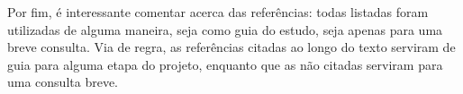     Por fim, é interessante comentar acerca das referências:
    todas listadas foram utilizadas de alguma maneira, seja
    como guia do estudo, seja apenas para uma breve consulta.
    Via de regra, as referências citadas ao longo do texto
    serviram de guia para alguma etapa do projeto, enquanto que
    as não citadas serviram para uma consulta breve.